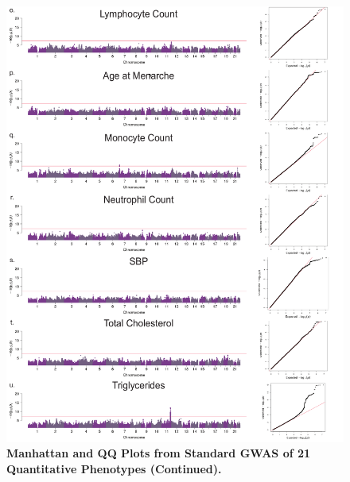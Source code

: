  
\begin{figure}[!htb]
\ContinuedFloat
\centering
\includegraphics[width=5in]{img/ch02/fig-s1c.pdf}
\caption[]{\textbf{Manhattan and QQ Plots from Standard GWAS of 21 Quantitative Phenotypes (Continued).} }
\label{fig:fig-s1c}
\end{figure}




